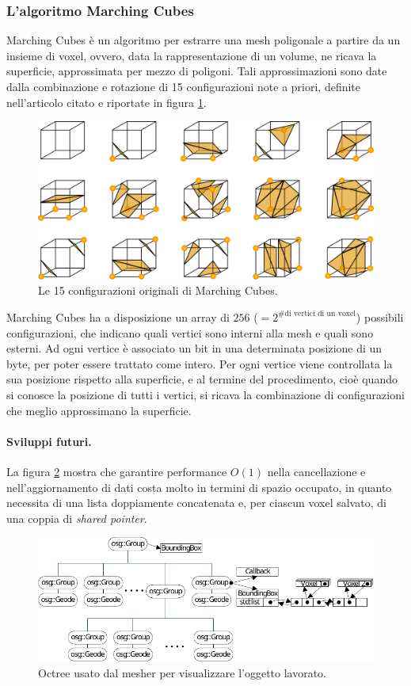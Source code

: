 \subsubsection{L'algoritmo Marching Cubes}
\label{mcalgo} Marching Cubes \cite{Lorensen:1987:MCH:37402.37422} è un algoritmo per estrarre una mesh poligonale a partire da un insieme di voxel, ovvero, data la rappresentazione di un volume, ne ricava la superficie, approssimata per mezzo di poligoni. Tali approssimazioni sono date dalla combinazione e rotazione di 15 configurazioni note a priori, definite nell'articolo citato e riportate in figura \ref{fig:mcpolys}.

\begin{figure}[htp]
	\centering
	\includegraphics[width=.85\textwidth]{img/mcpolys}
	\caption{Le 15 configurazioni originali di Marching Cubes.}
	\label{fig:mcpolys}
\end{figure}

Marching Cubes ha a disposizione un array di $256$ ($ = 2^{\mbox{\# di vertici di un voxel}}$) possibili configurazioni, che indicano quali vertici sono interni alla mesh e quali sono esterni. Ad ogni vertice è associato un bit in una determinata posizione di un byte, per poter essere trattato come intero. Per ogni vertice viene controllata la sua posizione rispetto alla superficie, e al termine del procedimento, cioè quando si conosce la posizione di tutti i vertici, si ricava la combinazione di configurazioni che meglio approssimano la superficie.

\paragraph{Sviluppi futuri.}
La figura \ref{fig:meshing_octree} mostra che garantire performance $O(1)$ nella cancellazione e nell'aggiornamento di dati costa molto in termini di spazio occupato, in quanto necessita di una lista doppiamente concatenata e, per ciascun voxel salvato, di una coppia di \emph{shared pointer}.
\begin{figure}[htp]
	\centering
	\includegraphics[width=.85\textwidth]{img/meshing_octree}
	\caption{Octree usato dal mesher per visualizzare l'oggetto lavorato.}
	\label{fig:meshing_octree}
\end{figure}

